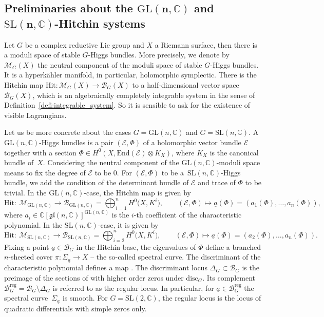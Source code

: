 \documentclass[10pt,a4paper]{amsart}
\numberwithin{equation}{section}
\theoremstyle{definition}
\newcommand{\End}{\mathrm{End}}
\newcommand{\disc}{\mathrm{disc}}
\newcommand{\reg}{\mathrm{reg}}
\renewcommand{\to}{\rightarrow}
\newcommand{\calB}{\mathcal{B}}
\newcommand{\calE}{\mathcal{E}}
\newcommand{\calM}{\mathcal{M}}
\newcommand{\CC}{\mathbb{C}}
\newcommand{\C}{\mathbb{C}}
\newcommand{\Hit}{\mathrm{Hit}}
\newcommand{\GL}{\mathrm{GL}}
\newcommand{\SL}{\mathrm{SL}}
\newcommand{\gl}{\mathfrak{gl}}
\begin{document}
\subsection[Preliminaries about the GL(n,C) and SL(n,C)-Hitchin systems]{Preliminaries about the $\boldsymbol{\GL(n,\CC)}$ and $\boldsymbol{\SL(n,\CC)}$-Hitchin systems}\label{sec:prel-Hitchin_syst}

Let $G$ be a complex reductive Lie group and $X$ a Riemann surface, then there is a moduli space of stable $G$-Higgs bundles. More precisely, we denote by $\calM_G(X)$ the neutral component of the moduli space of stable $G$-Higgs bundles. It is a hyperk\"ahler manifold, in particular, holomorphic symplectic. There is the Hitchin map $\Hit\colon \calM_G(X) \to \calB_G(X)$ to a half-dimensional vector space $\calB_G(X)$, which is an algebraically completely integrable system in the sense of Definition~\ref{defi:integrable_system}. So it is sensible to ask for the existence of visible Lagrangians.

Let us be more concrete about the cases $G=\GL(n,\CC)$ and $G=\SL(n,\CC)$. A $\GL(n,\CC)$-Higgs bundles is a pair $(\calE,\Phi)$ of a holomorphic vector bundle $\calE$ together with a section $\Phi \in H^0(X,\End(\calE)\otimes K_X)$, where $K_X$ is the canonical bundle of~$X$. Considering the neutral component of the $\GL(n,\C)$-moduli space means to fix the degree of $\calE$ to be $0$. For $(\calE,\Phi)$ to be a~$\SL(n,\CC)$-Higgs bundle, we add the condition of the determinant bundle of $\calE$ and trace of $\Phi$ to be trivial. In the $\GL(n,\CC)$-case, the Hitchin map is given by
\[ \Hit\colon \ \calM_{\GL(n,\CC)} \to \calB_{\GL(n,\CC)}= \bigoplus_{i=1}^n H^0\bigl(X,K^i\bigr), \qquad (\calE,\Phi) \mapsto \underline{a}(\Phi)=(a_1(\Phi),\dots,a_n(\Phi)),
\]
where $a_i \in \CC[\gl(n,\CC)]^{\GL(n,\CC)}$ is the $i$-th coefficient of the characteristic polynomial. In the $\SL(n,\CC)$-case, it is given by
\[ \Hit \colon \ \calM_{\SL(n,\CC)} \to \calB_{\SL(n,\CC)}= \bigoplus_{i=2}^n H^0\bigl(X,K^i\bigr), \qquad (\calE,\Phi) \mapsto \underline{a}(\Phi)=(a_2(\Phi),\dots,a_n(\Phi)).
\]
Fixing a point $\underline{a} \in \calB_G$ in the Hitchin base, the eigenvalues of $\Phi$ define a branched $n$-sheeted cover $\pi\colon \Sigma_{\underline{a}} \to X$ -- the so-called spectral curve. The discriminant of the characteristic polynomial defines a map \smash{$\disc_G\colon \calB_G \to H^0\bigl(X,K^{r(r-1)}\bigr)$}. The discriminant locus $\Delta_G \subset \calB_G$ is the preimage of the sections of  with higher order zeros under $\disc_G$. Its complement $\calB_G^{\reg}=\calB_G \setminus \Delta_G$ is referred to as the regular locus. In particular, for $\underline{a} \in \calB^{\reg}_G$ the spectral curve~$\Sigma_{\underline{a}}$ is smooth. For $G=\SL(2,\CC)$, the regular locus \smash{$\calB_{\SL(2,\CC)}^{\reg}$} is the locus of quadratic differentials with simple zeros only.
\end{document}
